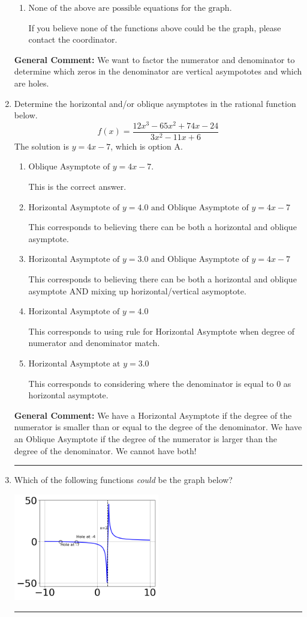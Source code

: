\documentclass{extbook}[14pt]
\newcommand{\litem}[1]{\item #1

\rule{\textwidth}{0.4pt}}
\begin{document}
\begin{enumerate}
{\begin{enumerate}[label=\Alph*.]
You treated all of the zeros in the denominator as vertical asymptotes when some of them were holes!
\item \( \text{None of the above are possible equations for the graph.} \)

If you believe none of the functions above could be the graph, please contact the coordinator.
\end{enumerate}

\textbf{General Comment:} We want to factor the numerator and denominator to determine which zeros in the denominator are vertical asympototes and which are holes.
}
\litem{
Determine the horizontal and/or oblique asymptotes in the rational function below.
\[ f(x) = \frac{12x^{3} -65 x^{2} +74 x -24}{3x^{2} -11 x + 6} \]The solution is \( y = 4x -7 \), which is option A.\begin{enumerate}[label=\Alph*.]
\item \( \text{Oblique Asymptote of } y = 4x -7. \)

This is the correct answer.
\item \( \text{Horizontal Asymptote of } y = 4.0 \text{ and Oblique Asymptote of } y = 4x -7 \)

This corresponds to believing there can be both a horizontal and oblique asymptote.
\item \( \text{Horizontal Asymptote of } y = 3.0 \text{ and Oblique Asymptote of } y = 4x -7 \)

This corresponds to believing there can be both a horizontal and oblique asymptote AND mixing up horizontal/vertical asymoptote.
\item \( \text{Horizontal Asymptote of } y = 4.0  \)

This corresponds to using rule for Horizontal Asymptote when degree of numerator and denominator match.
\item \( \text{Horizontal Asymptote at } y = 3.0 \)

This corresponds to considering where the denominator is equal to 0 as horizontal asymptote.
\end{enumerate}

\textbf{General Comment:} We have a Horizontal Asymptote if the degree of the numerator is smaller than or equal to the degree of the denominator. We have an Oblique Asymptote if the degree of the numerator is larger than the degree of the denominator. We cannot have both!
}
\litem{
Which of the following functions \textit{could} be the graph below?

\begin{center}
    \includegraphics[width=0.5\textwidth]{../Figures/identifyGraphOfRationalFunctionA.png}
\end{center}


}
\end{enumerate}
\end{document}

